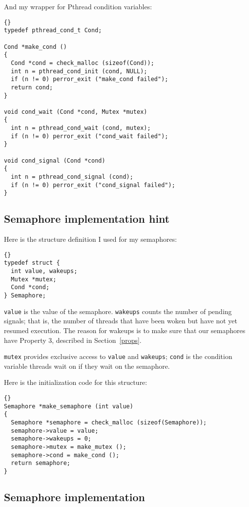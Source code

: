 \documentclass{book}
\newcommand{\clearemptydoublepage}{\newpage\cleardoublepage}
\begin{document}
\newpage
And my wrapper for Pthread condition variables:

\begin{lstlisting}[title={}]{}
typedef pthread_cond_t Cond;

Cond *make_cond ()
{
  Cond *cond = check_malloc (sizeof(Cond)); 
  int n = pthread_cond_init (cond, NULL);
  if (n != 0) perror_exit ("make_cond failed");
  return cond;
}

void cond_wait (Cond *cond, Mutex *mutex)
{
  int n = pthread_cond_wait (cond, mutex);
  if (n != 0) perror_exit ("cond_wait failed");
}

void cond_signal (Cond *cond)
{
  int n = pthread_cond_signal (cond);
  if (n != 0) perror_exit ("cond_signal failed");
}
\end{lstlisting}



\clearemptydoublepage
\subsection{Semaphore implementation hint}

Here is the structure definition I used for my semaphores:

\begin{lstlisting}[title={}]{}
typedef struct {
  int value, wakeups;
  Mutex *mutex;
  Cond *cond;
} Semaphore;
\end{lstlisting}

{\tt value} is the value of the semaphore.  {\tt wakeups} counts
the number of pending signals; that is, the number of threads
that have been woken but have not yet resumed execution.  The reason
for wakeups is to make sure that our semaphores have
Property 3, described in Section~\ref{props}.

{\tt mutex} provides exclusive access to {\tt value} and
{\tt wakeups}; {\tt cond} is the condition variable threads
wait on if they wait on the semaphore.

Here is the initialization code for this structure:

\begin{lstlisting}[title={}]{}
Semaphore *make_semaphore (int value)
{
  Semaphore *semaphore = check_malloc (sizeof(Semaphore));
  semaphore->value = value;
  semaphore->wakeups = 0;
  semaphore->mutex = make_mutex ();
  semaphore->cond = make_cond ();
  return semaphore;
}
\end{lstlisting}


\clearemptydoublepage
\subsection{Semaphore implementation}
\end{document}
